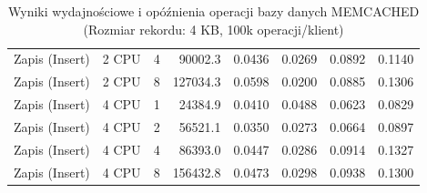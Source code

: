 \begin{table}[ht]
{\begin{tabular}{llcrrrrr}
Zapis (Insert) & 2 CPU & 4 & 90002.3 & 0.0436 & 0.0269 & 0.0892 & 0.1140 \\
Zapis (Insert) & 2 CPU & 8 & 127034.3 & 0.0598 & 0.0200 & 0.0885 & 0.1306 \\
Zapis (Insert) & 4 CPU & 1 & 24384.9 & 0.0410 & 0.0488 & 0.0623 & 0.0829 \\
Zapis (Insert) & 4 CPU & 2 & 56521.1 & 0.0350 & 0.0273 & 0.0664 & 0.0897 \\
Zapis (Insert) & 4 CPU & 4 & 86393.0 & 0.0447 & 0.0286 & 0.0914 & 0.1327 \\
Zapis (Insert) & 4 CPU & 8 & 156432.8 & 0.0473 & 0.0298 & 0.0938 & 0.1300 \\
\bottomrule
\end{tabular}%
}
\caption{Wyniki wydajnościowe i opóźnienia operacji bazy danych MEMCACHED (Rozmiar rekordu: 4 KB, 100k operacji/klient)}
\label{tab:latency_memcached_medium_100000}
\end{table}
